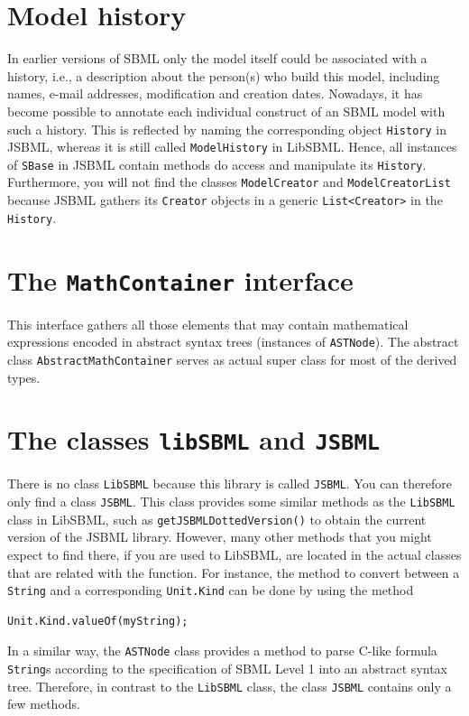 \documentclass[
  letterpaper,
  11pt,
  headsepline,
  pointlessnumbers,
  tablecaptionabove,
  headinclude,
  appendixprefix,
  idxtotoc,
  bibtotoc
]{scrartcl}
\begin{document}
\section{Model history}

In earlier versions of SBML only the model itself could be associated with a
history, i.e., a description about the person(s) who build this model, including
names, e-mail addresses, modification and creation dates. Nowadays, it has
become possible to annotate each individual construct of an SBML model with such
a history. This is reflected by naming the corresponding object \verb!History!
in JSBML, whereas it is still called \verb!ModelHistory! in LibSBML. Hence, all
instances of \verb!SBase! in JSBML contain methods do access and manipulate its
\verb!History!. Furthermore, you will not find the classes \verb!ModelCreator!
and \verb!ModelCreatorList! because JSBML gathers its \verb!Creator! objects
in a generic \verb!List<Creator>! in the \verb!History!.

\section{The \texttt{MathContainer} interface}

This interface gathers all those elements that may contain mathematical
expressions encoded in abstract syntax trees (instances of \verb!ASTNode!).
The abstract class \verb!AbstractMathContainer! serves as actual super class
for most of the derived types.
 

\section{The classes \texttt{libSBML} and \texttt{JSBML}}

There is no class \texttt{LibSBML} because this library is called \texttt{JSBML}. You
can therefore only find a class \texttt{JSBML}. This class provides some similar
methods as the \texttt{LibSBML} class in LibSBML, such as  \verb!getJSBMLDottedVersion()!
to obtain the current version of the JSBML library. However, many other methods that you
might expect to find there, if you are used to LibSBML, are located in the actual
classes that are related with the function. For instance, the method to convert between
a \verb!String! and a corresponding \verb!Unit.Kind! can be done by using the method
\begin{verbatim}
Unit.Kind.valueOf(myString);
\end{verbatim}
In a similar way, the \verb!ASTNode! class provides a method to parse C-like formula
\verb!String!s according to the specification of SBML Level 1 into an abstract syntax tree.
Therefore, in contrast to the  \texttt{LibSBML} class, the class \texttt{JSBML} contains
only a few methods.
\end{document}
